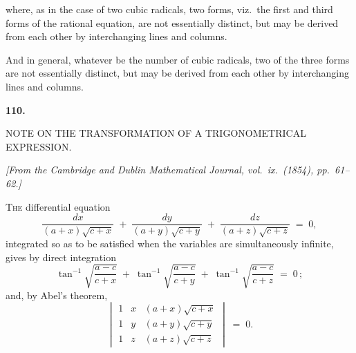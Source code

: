 \documentclass[11pt]{article}
\begin{document}
\medskip

where, as in the case of two cubic radicals, two forms, viz.\ the first and third forms of the rational equation, are not essentially distinct, but may be derived from each other by interchanging lines and columns.

And in general, whatever be the number of cubic radicals, two of the three forms are not essentially distinct, but may be derived from each other by interchanging lines and columns.

\clearpage


\begin{center}\textbf{110.}\par\medskip
{\large NOTE ON THE TRANSFORMATION OF A TRIGONOMETRICAL\\
EXPRESSION.}
\end{center}

\noindent\emph{[From the Cambridge and Dublin Mathematical Journal, vol.\ ix.\ (1854), pp.\ 61--62.]}

\bigskip

\noindent\textsc{The} differential equation
\[
\frac{dx}{(a+x)\sqrt{c+x}} \;+\; \frac{dy}{(a+y)\sqrt{c+y}} \;+\; \frac{dz}{(a+z)\sqrt{c+z}} \;=\; 0,
\]
integrated so as to be satisfied when the variables are simultaneously infinite, gives by direct integration
\[
\tan^{-1}\!\sqrt{\frac{a-c}{c+x}} \;+\; \tan^{-1}\!\sqrt{\frac{a-c}{c+y}} \;+\; \tan^{-1}\!\sqrt{\frac{a-c}{c+z}} \;=\; 0\,;
\]
and, by Abel's theorem,
\[
\begin{vmatrix}
1 & x & (a + x)\sqrt{c + x} \\
1 & y & (a + y)\sqrt{c + y} \\
1 & z & (a + z)\sqrt{c + z}
\end{vmatrix} \;=\; 0.
\]
\end{document}
